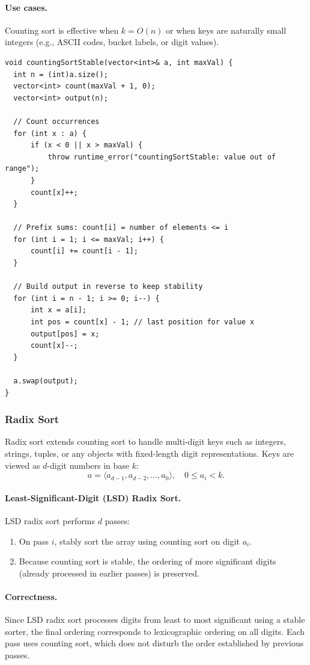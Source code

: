 \documentclass[9pt]{extarticle}
\begin{document}
\paragraph{Use cases.}
Counting sort is effective when $k = O(n)$ or when keys are naturally small
integers (e.g., ASCII codes, bucket labels, or digit values).
\begin{lstlisting}
void countingSortStable(vector<int>& a, int maxVal) {
  int n = (int)a.size();
  vector<int> count(maxVal + 1, 0);
  vector<int> output(n);

  // Count occurrences
  for (int x : a) {
      if (x < 0 || x > maxVal) {
          throw runtime_error("countingSortStable: value out of range");
      }
      count[x]++;
  }

  // Prefix sums: count[i] = number of elements <= i
  for (int i = 1; i <= maxVal; i++) {
      count[i] += count[i - 1];
  }

  // Build output in reverse to keep stability
  for (int i = n - 1; i >= 0; i--) {
      int x = a[i];
      int pos = count[x] - 1; // last position for value x
      output[pos] = x;
      count[x]--;
  }

  a.swap(output);
}
\end{lstlisting}
\subsubsection{Radix Sort}

Radix sort extends counting sort to handle multi-digit keys such as integers,
strings, tuples, or any objects with fixed-length digit representations.
Keys are viewed as $d$-digit numbers in base $k$:
\[
    a = \langle a_{d-1}, a_{d-2}, \dots, a_0 \rangle,
\quad
    0 \le a_i < k.
\]

\paragraph{Least-Significant-Digit (LSD) Radix Sort.}
LSD radix sort performs $d$ passes:
\begin{enumerate}
    \item On pass $i$, stably sort the array using counting sort on digit $a_i$.
    \item Because counting sort is stable, the ordering of more significant
          digits (already processed in earlier passes) is preserved.
\end{enumerate}

\paragraph{Correctness.}
Since LSD radix sort processes digits from least to most significant using a
stable sorter, the final ordering corresponds to lexicographic ordering on all
digits.  
Each pass uses counting sort, which does not disturb the order established by 
previous passes.
\end{document}
